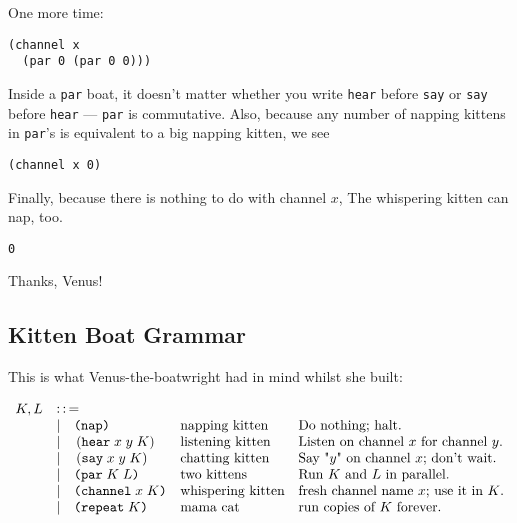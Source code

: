 \documentclass[10pt,oneside,x11names]{article}
\newcommand{\Coloneqq}{\mathrel{\vcenter{\hbox{$:\,:\,=$}}{}}}
\theoremstyle{definition}
\theoremstyle{warning}
\newcommand\say [3]{\left(\texttt{say}\thickspace{}#1\thickspace{}#2\thickspace{}#3\right)}
\newcommand\hear[3]{\left(\texttt{hear}\thickspace{}#1\thickspace{}#2\thickspace{}#3\right)}
\newcommand\knapping    [0]{\texttt{(nap)}}
\newcommand\kpar        [2]{\texttt{(par}\thickspace{}#1\thickspace{}#2\texttt{)}}
\newcommand\kwhispering [2]{\texttt{(channel}\thickspace{}#1\thickspace{}#2\texttt{)}}
\newcommand\kmama       [1]{\texttt{(repeat}\thickspace{}#1\texttt{)}}
\begin{document}
One more time:

\vskip 0.26cm
\begin{verbatim}
(channel x
  (par 0 (par 0 0)))
\end{verbatim}

Inside a \texttt{par} boat, it doesn't matter whether you write \texttt{hear}
before \texttt{say} or \texttt{say} before \texttt{hear} --- \texttt{par} is commutative.
Also, because any number of napping kittens in \texttt{par}'s is
equivalent to a big napping kitten, we see

\vskip 0.26cm
\begin{verbatim}
(channel x 0)
\end{verbatim}

Finally, because there is nothing to do with channel \(x\), The
whispering kitten can nap, too.

\vskip 0.26cm
\begin{verbatim}
0
\end{verbatim}

Thanks, Venus!

\subsection{Kitten Boat Grammar}
\label{sec:org1d1d93d}

This is what Venus-the-boatwright had in mind whilst she built:

\begin{equation}
\begin{array}{clll}
  K, L & \Coloneqq \\
       & | \quad \knapping            & \textrm{napping kitten}    & \textrm{Do nothing; halt.}                                   \\
       & | \quad \hear{x}{y}{K}       & \textrm{listening kitten}  & \textrm{Listen on channel }x\textrm{ for channel }y.         \\
       & | \quad \say{x}{y}{K}        & \textrm{chatting kitten}   & \textrm{Say "}y\textrm{" on channel }x\textrm{; don't wait.} \\
       & | \quad \kpar{K}{L}          & \textrm{two kittens}       & \textrm{Run }K\textrm{ and }L\textrm{ in parallel.}          \\
       & | \quad \kwhispering{x}{K}   & \textrm{whispering kitten} & \textrm{fresh channel name }x\textrm{; use it in }K\textrm{.}\\
       & | \quad \kmama{K}            & \textrm{mama cat}          & \textrm{run copies of }K\textrm{ forever}\textrm{.}          \\
\end{array}
\end{equation}
\end{document}

